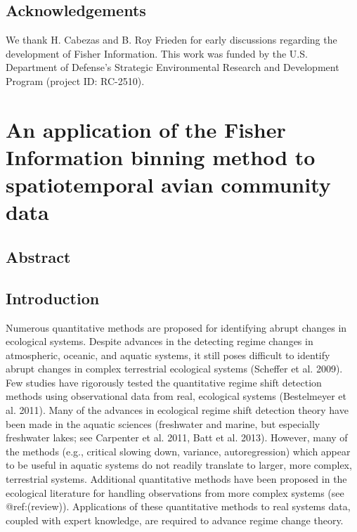 \documentclass[12pt,twoside]{reedthesis}
\begin{document}
\section{Acknowledgements}\label{acknowledgements-1}

We thank H. Cabezas and B. Roy Frieden for early discussions regarding
the development of Fisher Information. This work was funded by the U.S.
Department of Defense's Strategic Environmental Research and Development
Program (project ID: RC-2510).

\chapter{An application of the Fisher Information binning method to
spatiotemporal avian community
data}\label{an-application-of-the-fisher-information-binning-method-to-spatiotemporal-avian-community-data}

\section{Abstract}\label{abstract-2}

\section{Introduction}\label{introduction-2}

Numerous quantitative methods are proposed for identifying abrupt
changes in ecological systems. Despite advances in the detecting regime
changes in atmospheric, oceanic, and aquatic systems, it still poses
difficult to identify abrupt changes in complex terrestrial ecological
systems (Scheffer et al. 2009). Few studies have rigorously tested the
quantitative regime shift detection methods using observational data
from real, ecological systems (Bestelmeyer et al. 2011). Many of the
advances in ecological regime shift detection theory have been made in
the aquatic sciences (freshwater and marine, but especially freshwater
lakes; see Carpenter et al. 2011, Batt et al. 2013). However, many of
the methods (e.g., critical slowing down, variance, autoregression)
which appear to be useful in aquatic systems do not readily translate to
larger, more complex, terrestrial systems. Additional quantitative
methods have been proposed in the ecological literature for handling
observations from more complex systems (see @ref:(review)). Applications
of these quantitative methods to real systems data, coupled with expert
knowledge, are required to advance regime change theory.
\end{document}
